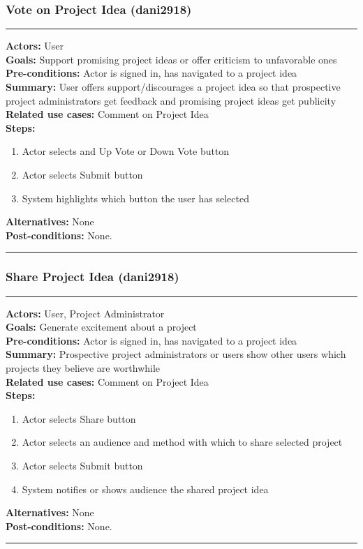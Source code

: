 \documentclass[11pt]{report}
\begin{document}
\subsubsection{Vote on Project Idea (dani2918)}
\vspace{2pt}
\hrule
\vspace{8pt}
 \textbf{Actors:} User \\ 
 \textbf{Goals:} Support promising project ideas or offer criticism to unfavorable ones  \\
 \textbf{Pre-conditions:} Actor is signed in, has navigated to a project idea  \\
 \textbf{Summary:}  User offers support/discourages a project idea so that prospective project administrators get feedback and promising project ideas get publicity \\ 
 \textbf{Related use cases:} Comment on Project Idea \\ 
 \textbf{Steps:} \begin{enumerate}
  \item Actor selects and Up Vote or Down Vote button
  \item Actor selects Submit button 
  \item System highlights which button the user has selected
 \end{enumerate}
 \textbf{Alternatives:} None \\
 \textbf{Post-conditions:} None. \\
 \vspace{8pt}
\hrule
\newpage
\subsubsection{Share Project Idea (dani2918)}
\vspace{2pt}
\hrule
\vspace{8pt}
 \textbf{Actors:} User, Project Administrator \\ 
 \textbf{Goals:} Generate excitement about a project  \\
 \textbf{Pre-conditions:} Actor is signed in, has navigated to a project idea  \\
 \textbf{Summary:}  Prospective project administrators or users show other users which projects they believe are worthwhile \\ 
 \textbf{Related use cases:} Comment on Project Idea \\ 
 \textbf{Steps:} \begin{enumerate}
  \item Actor selects Share button
  \item Actor selects an audience and method with which to share selected project
  \item Actor selects Submit button
  \item System notifies or shows audience the shared project idea
 \end{enumerate}
 \textbf{Alternatives:} None \\
 \textbf{Post-conditions:} None. \\
 \vspace{8pt}
\hrule
\newpage
\end{document}
